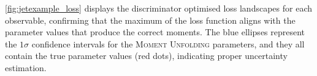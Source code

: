             \cref{fig:jetexample_loss} displays the discriminator optimised loss landscapes for each observable, confirming that the maximum of the loss function aligns with the parameter values that produce the correct moments.
            The blue ellipses represent the \(1\sigma\) confidence intervals for the \textsc{Moment Unfolding} parameters, and they all contain the true parameter values (red dots), indicating proper uncertainty estimation.
\begin{figure}
    \\
    

\end{figure}
